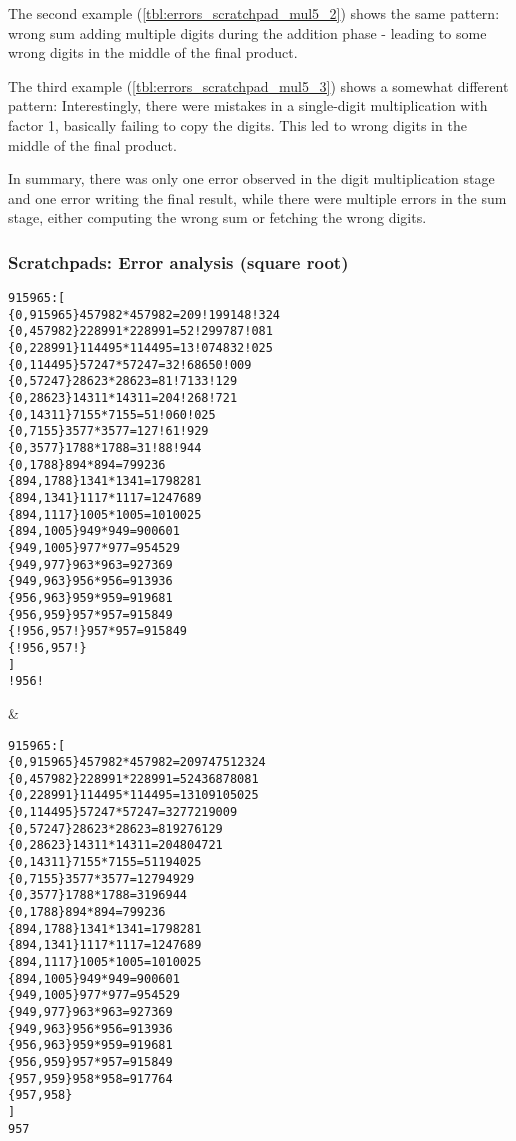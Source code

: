 The second example  (\cref{tbl:errors_scratchpad_mul5_2}) shows the same pattern: wrong sum adding multiple digits during the addition phase - leading to some wrong digits in the middle of the final product.

The third example  (\cref{tbl:errors_scratchpad_mul5_3}) shows a somewhat different pattern: Interestingly, there were mistakes in a single-digit multiplication with factor 1, basically failing to copy the digits. This led to wrong digits in the middle of the final product.

In summary, there was only one error observed in the digit multiplication stage and one error writing the final result, while there were multiple errors in the sum stage, either computing the wrong sum or fetching the wrong digits.

\subsubsection{Scratchpads: Error analysis (square root)}



\ErrorAnalysisTableBegin
\begin{lstlisting}
915965:[
{0,915965}457982*457982=209!199148!324
{0,457982}228991*228991=52!299787!081
{0,228991}114495*114495=13!074832!025
{0,114495}57247*57247=32!68650!009
{0,57247}28623*28623=81!7133!129
{0,28623}14311*14311=204!268!721
{0,14311}7155*7155=51!060!025
{0,7155}3577*3577=127!61!929
{0,3577}1788*1788=31!88!944
{0,1788}894*894=799236
{894,1788}1341*1341=1798281
{894,1341}1117*1117=1247689
{894,1117}1005*1005=1010025
{894,1005}949*949=900601
{949,1005}977*977=954529
{949,977}963*963=927369
{949,963}956*956=913936
{956,963}959*959=919681
{956,959}957*957=915849
{!956,957!}957*957=915849
{!956,957!}
]
!956!
\end{lstlisting} &
\begin{lstlisting}
915965:[
{0,915965}457982*457982=209747512324
{0,457982}228991*228991=52436878081
{0,228991}114495*114495=13109105025
{0,114495}57247*57247=3277219009
{0,57247}28623*28623=819276129
{0,28623}14311*14311=204804721
{0,14311}7155*7155=51194025
{0,7155}3577*3577=12794929
{0,3577}1788*1788=3196944
{0,1788}894*894=799236
{894,1788}1341*1341=1798281
{894,1341}1117*1117=1247689
{894,1117}1005*1005=1010025
{894,1005}949*949=900601
{949,1005}977*977=954529
{949,977}963*963=927369
{949,963}956*956=913936
{956,963}959*959=919681
{956,959}957*957=915849
{957,959}958*958=917764
{957,958}
]
957
\end{lstlisting} \\


